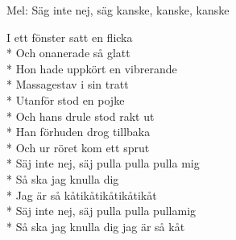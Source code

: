 \begin{SongText}
    \begin{SongInfo}
        Mel: Säg inte nej, säg kanske, kanske, kanske
    \end{SongInfo}
    \begin{SongVerse}
        I ett fönster satt en flicka\\*%
        Och onanerade så glatt\\*%
        Hon hade uppkört en vibrerande\\*%
        Massagestav i sin tratt\\*%
        Utanför stod en pojke\\*%
        Och hans drule stod rakt ut\\*%
        Han förhuden drog tillbaka\\*%
        Och ur röret kom ett sprut\\*%
        Säj inte nej, säj pulla pulla pulla mig\\*%
        Så ska jag knulla dig\\*%
        Jag är så kåtikåtikåtikåtikåt\\*%
        Säj inte nej, säj pulla pulla pullamig\\*%
        Så ska jag knulla dig jag är så kåt
    \end{SongVerse}
\end{SongText}
